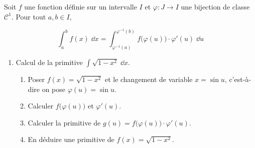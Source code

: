 \begin{frame}


\begin{theoreme}
Soit $f$ une fonction définie sur un intervalle $I$ et $\varphi : J \to I$ 
une bijection de classe $\mathcal{C}^1$. Pour tout $a,b\in I$,

$$\int_a^b f(x) \; \dd x 
= \int_{\varphi^{-1}(a)}^{\varphi^{-1}(b)} f\big(\varphi(u)\big)\cdot\varphi'(u) \; \dd u$$
\end{theoreme}

\end{frame}


\begin{frame}
\begin{tp}
\begin{enumerate}
  \item Calcul de la primitive $\displaystyle\int \sqrt{1-x^2} \; \dd x$.
  \begin{enumerate}
    \item Poser $f(x) = \sqrt{1-x^2}$ et le changement de variable $x = \sin u$, c'est-à-dire on pose 
    $\varphi(u) = \sin u$.
    \item Calculer $f\big( \varphi(u) \big)$ et $\varphi'(u)$.
    \item Calculer la primitive de $g(u) = f\big(\varphi(u)\big)\cdot\varphi'(u)$.
    \item En déduire une primitive de $f(x) = \sqrt{1-x^2}$.
  \end{enumerate}
  
    
  
  
  
  
  
\end{enumerate}
\end{tp}

\end{frame}

